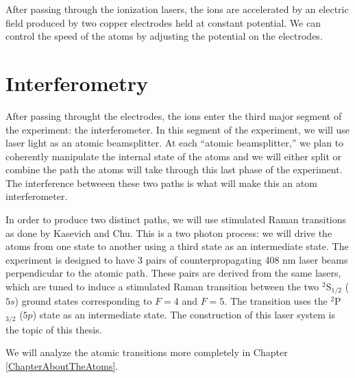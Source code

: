 After passing through the ionization lasers, the ions are accelerated by an electric field produced by two copper electrodes held at constant potential. We can control the speed of the atoms by adjusting the potential on the electrodes.%

\section{Interferometry}

After passing throught the electrodes, the ions enter the third major segment of the experiment: the interferometer. In this segment of the experiment, we will use laser light as an atomic beamsplitter. At each ``atomic beamsplitter,'' we plan to coherently manipulate the internal state of the atoms and we will either split or combine the path the atoms will take through this last phase of the experiment. The interference betweeen these two paths is what will make this an atom interferometer.

In order to produce two distinct paths, we will use stimulated Raman transitions as done by Kasevich and Chu\cite{kasevichChu1991}. This is a two photon process: we will drive the atoms from one state to another using a third state as an intermediate state. The experiment is designed to have 3 pairs of counterpropagating 408 nm laser beams perpendicular to the atomic path. These pairs are derived from the same lasers, which are tuned to induce a stimulated Raman transition between the two $^2$S$_{1/2}$ ($5s$) ground states corresponding to $F=4$ and $F=5$. The transition uses the $^2$P$_{3/2}$ ($5p$) state as an intermediate state. The construction of this laser system is the topic of this thesis.


We will analyze the atomic transitions more completely in Chapter \ref{ChapterAboutTheAtoms}.




